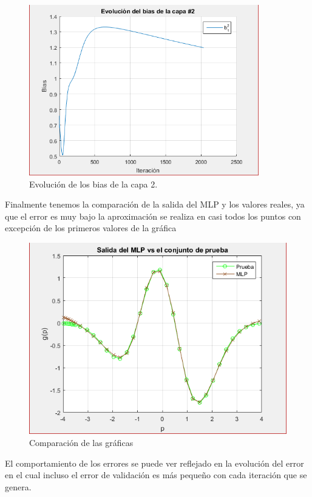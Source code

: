 \documentclass[12pt, titlepage]{article}
\begin{document}
\begin{figure}[H]
    \begin{center}
        \includegraphics[width=10cm]{2/bias2.png}
        \caption{Evolución de los bias de la capa 2.}
        \label{fig:bias4}
    \end{center}
\end{figure}
Finalmente tenemos la comparación de la salida del MLP y los valores reales, ya que el error es muy bajo la aproximación se realiza en casi todos los puntos con excepción de los primeros valores de la gráfica
\begin{figure}[H]
    \begin{center}
        \includegraphics[width=12cm]{2/prueba.png}
        \caption{Comparación de las gráficas}
        \label{fig:prueba2}
    \end{center}
\end{figure}
El comportamiento de los errores se puede ver reflejado en la evolución del error en el cual incluso el error de validación es más pequeño con cada iteración que se genera.
\end{document}
